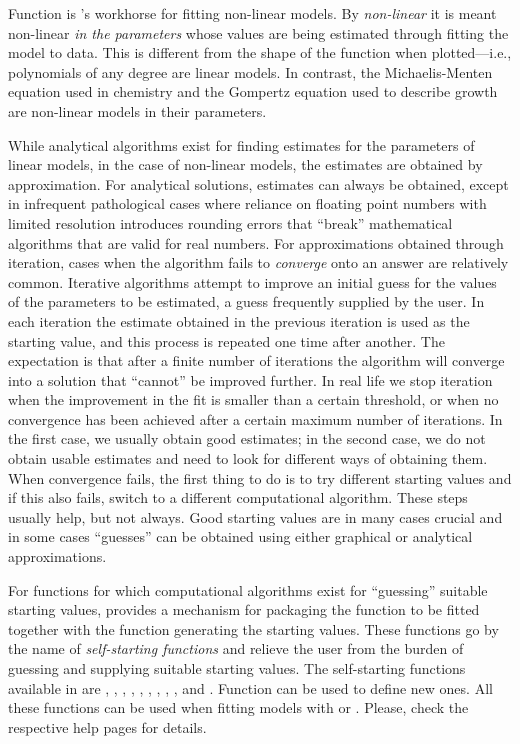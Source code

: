 \documentclass[krantz2]{krantz}\usepackage{knitr}
\begin{document}
Function  is \Rlang's workhorse for fitting non-linear models. By \emph{non-linear} it is meant non-linear \emph{in the parameters} whose values are being estimated through fitting the model to data. This is different from the shape of the function when plotted---i.e., polynomials of any degree are linear models. In contrast, the Michaelis-Menten equation used in chemistry and the  Gompertz equation used to describe growth are non-linear models in their parameters.

While analytical algorithms exist for finding estimates for the parameters of linear models, in the case of non-linear models, the estimates are obtained by approximation. For analytical solutions, estimates can always be obtained, except in infrequent pathological cases where reliance on floating point numbers with limited resolution introduces rounding errors that ``break'' mathematical algorithms that are valid for real numbers. For approximations obtained through iteration, cases when the algorithm fails to \emph{converge} onto an answer are relatively common. Iterative algorithms attempt to improve an initial guess for the values of the parameters to be estimated, a guess frequently supplied by the user. In each iteration the estimate obtained in the previous iteration is used as the starting value, and this process is repeated one time after another. The expectation is that after a finite number of iterations the algorithm will converge into a solution that ``cannot'' be improved further. In real life we stop iteration when the improvement in the fit is smaller than a certain threshold, or when no convergence has been achieved after a certain maximum number of iterations. In the first case, we usually obtain good estimates; in the second case, we do not obtain usable estimates and need to look for different ways of obtaining them. When convergence fails, the first thing to do is to try different starting values and if this also fails, switch to a different computational algorithm. These steps usually help, but not always. Good starting values are in many cases crucial and in some cases ``guesses'' can be obtained using either graphical or analytical approximations.

For functions for which computational algorithms exist for ``guessing'' suitable starting values, \Rlang provides a mechanism for packaging the function to be fitted together with the function generating the starting values. These functions go by the name of \emph{self-starting functions} and relieve the user from the burden of guessing and supplying suitable starting values. The self-starting functions available in \Rlang are , , , , , , , , , and . Function  can be used to define new ones. All these functions can be used when fitting models with  or . Please, check the respective help pages for details.
\end{document}
